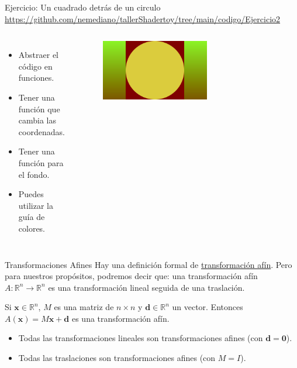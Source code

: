 \begin{frame}{Ejercicio: Un cuadrado detrás de un circulo}
\url{https://github.com/nemediano/tallerShadertoy/tree/main/codigo/Ejercicio2}
\begin{columns}
     \begin{itemize}
         \item Abstraer el código en funciones.
         \item Tener una función que cambia las coordenadas.
         \item Tener una función para el fondo.
         \item Puedes utilizar la guía de colores.
     \end{itemize}
        \begin{figure}[htb]
            \centering
            \includegraphics[width=0.6\textwidth]{img/Ejer/Ejer2}
        \end{figure}
\end{columns}
\end{frame}

\begin{frame}{Transformaciones Afines}
Hay una definición formal de \href{https://en.wikipedia.org/wiki/Affine_transformation}{transformación afín}. Pero para nuestros propósitos, podremos decir que: una transformación afín $A: \mathbb{R}^n \rightarrow \mathbb{R}^n$ es una transformación lineal seguida de una traslación.

\begin{block}{}
    Si $\mathbf{x} \in \mathbb{R}^n$, $M$ es una matriz de $n \times n$ y $\mathbf{d} \in \mathbb{R}^n$ un vector.
    Entonces $A(\mathbf{x}) = M \mathbf{x} + \mathbf{d}$ es una transformación afín.
\end{block}
\begin{itemize}
    \item Todas las transformaciones lineales son transformaciones afines (con $\mathbf{d} = \mathbf{0}$).
    \item Todas las traslaciones son transformaciones afines (con $M = I$).
\end{itemize}
\end{frame}



